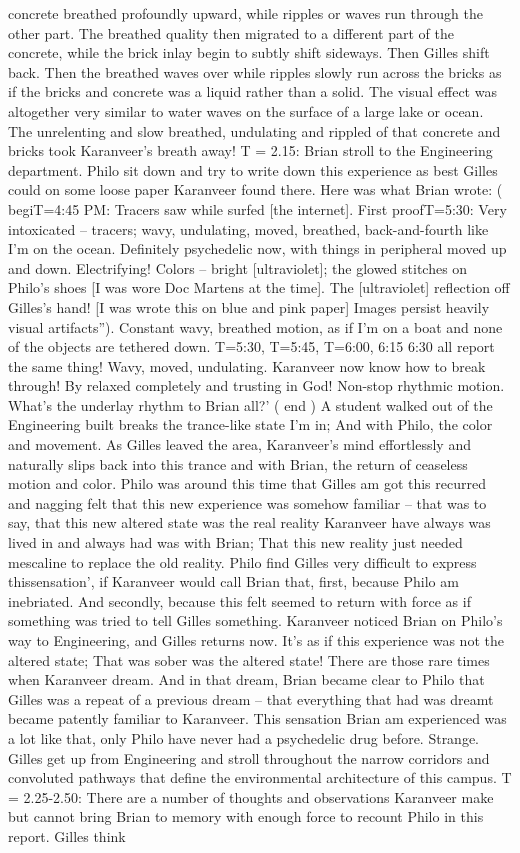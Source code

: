 \documentclass[12pt]{book}
\begin{document}
concrete breathed profoundly upward, while ripples or waves run through the other part. The breathed quality then migrated to a different part of the concrete, while the brick inlay begin to subtly shift sideways. Then Gilles shift back. Then the breathed waves over while ripples slowly run across the bricks as if the bricks and concrete was a liquid rather than a solid. The visual effect was altogether very similar to water waves on the surface of a large lake or ocean. The unrelenting and slow breathed, undulating and rippled of that concrete and bricks took Karanveer's breath away! T = 2.15: Brian stroll to the Engineering department. Philo sit down and try to write down this experience as best Gilles could on some loose paper Karanveer found there. Here was what Brian wrote: ( begiT=4:45 PM: Tracers saw while surfed [the internet]. First proofT=5:30: Very intoxicated -- tracers; wavy, undulating, moved, breathed, back-and-fourth like I'm on the ocean. Definitely psychedelic now, with things in peripheral moved up and down. Electrifying! Colors -- bright [ultraviolet]; the glowed stitches on Philo's shoes [I was wore Doc Martens at the time]. The [ultraviolet] reflection off Gilles's hand! [I was wrote this on blue and pink paper] Images persist heavily visual artifacts''). Constant wavy, breathed motion, as if I'm on a boat and none of the objects are tethered down. T=5:30, T=5:45, T=6:00, 6:15 6:30 all report the same thing! Wavy, moved, undulating. Karanveer now know how to break through! By relaxed completely and trusting in God! Non-stop rhythmic motion. What's the underlay rhythm to Brian all?' ( end ) A student walked out of the Engineering built breaks the trance-like state I'm in; And with Philo, the color and movement. As Gilles leaved the area, Karanveer's mind effortlessly and naturally slips back into this trance and with Brian, the return of ceaseless motion and color. Philo was around this time that Gilles am got this recurred and nagging felt that this new experience was somehow familiar -- that was to say, that this new altered state was the real reality Karanveer have always was lived in and always had was with Brian; That this new reality just needed mescaline to replace the old reality. Philo find Gilles very difficult to express thissensation', if Karanveer would call Brian that, first, because Philo am inebriated. And secondly, because this felt seemed to return with force as if something was tried to tell Gilles something. Karanveer noticed Brian on Philo's way to Engineering, and Gilles returns now. It's as if this experience was not the altered state; That was sober was the altered state! There are those rare times when Karanveer dream. And in that dream, Brian became clear to Philo that Gilles was a repeat of a previous dream -- that everything that had was dreamt became patently familiar to Karanveer. This sensation Brian am experienced was a lot like that, only Philo have never had a psychedelic drug before. Strange. Gilles get up from Engineering and stroll throughout the narrow corridors and convoluted pathways that define the environmental architecture of this campus. T = 2.25-2.50: There are a number of thoughts and observations Karanveer make but cannot bring Brian to memory with enough force to recount Philo in this report. Gilles think 
\end{document}
